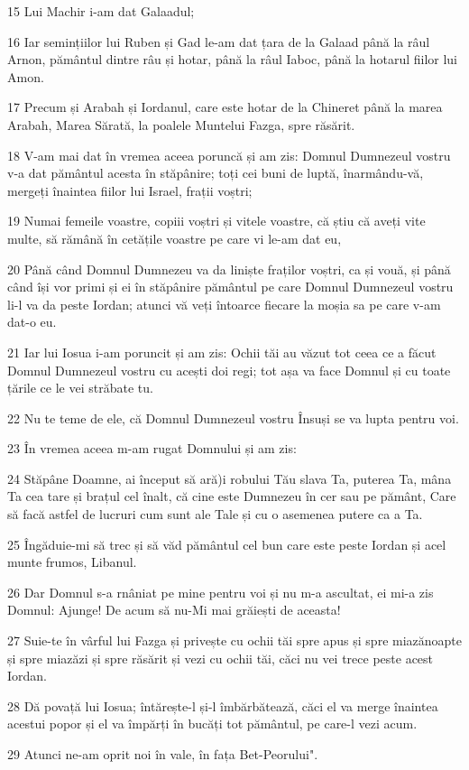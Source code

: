 \par 15 Lui Machir i-am dat Galaadul;
\par 16 Iar semințiilor lui Ruben și Gad le-am dat țara de la Galaad până la râul Arnon, pământul dintre râu și hotar, până la râul Iaboc, până la hotarul fiilor lui Amon.
\par 17 Precum și Arabah și Iordanul, care este hotar de la Chineret până la marea Arabah, Marea Sărată, la poalele Muntelui Fazga, spre răsărit.
\par 18 V-am mai dat în vremea aceea poruncă și am zis: Domnul Dumnezeul vostru v-a dat pământul acesta în stăpânire; toți cei buni de luptă, înarmându-vă, mergeți înaintea fiilor lui Israel, frații voștri;
\par 19 Numai femeile voastre, copiii voștri și vitele voastre, că știu că aveți vite multe, să rămână în cetățile voastre pe care vi le-am dat eu,
\par 20 Până când Domnul Dumnezeu va da liniște fraților voștri, ca și vouă, și până când își vor primi și ei în stăpânire pământul pe care Domnul Dumnezeul vostru li-l va da peste Iordan; atunci vă veți întoarce fiecare la moșia sa pe care v-am dat-o eu.
\par 21 Iar lui Iosua i-am poruncit și am zis: Ochii tăi au văzut tot ceea ce a făcut Domnul Dumnezeul vostru cu acești doi regi; tot așa va face Domnul și cu toate țările ce le vei străbate tu.
\par 22 Nu te teme de ele, că Domnul Dumnezeul vostru Însuși se va lupta pentru voi.
\par 23 În vremea aceea m-am rugat Domnului și am zis:
\par 24 Stăpâne Doamne, ai început să ară)i robului Tău slava Ta, puterea Ta, mâna Ta cea tare și brațul cel înalt, că cine este Dumnezeu în cer sau pe pământ, Care să facă astfel de lucruri cum sunt ale Tale și cu o asemenea putere ca a Ta.
\par 25 Îngăduie-mi să trec și să văd pământul cel bun care este peste Iordan și acel munte frumos, Libanul.
\par 26 Dar Domnul s-a rnâniat pe mine pentru voi și nu m-a ascultat, ei mi-a zis Domnul: Ajunge! De acum să nu-Mi mai grăiești de aceasta!
\par 27 Suie-te în vârful lui Fazga și privește cu ochii tăi spre apus și spre miazănoapte și spre miazăzi și spre răsărit și vezi cu ochii tăi, căci nu vei trece peste acest Iordan.
\par 28 Dă povață lui Iosua; întărește-l și-l îmbărbătează, căci el va merge înaintea acestui popor și el va împărți în bucăți tot pământul, pe care-l vezi acum.
\par 29 Atunci ne-am oprit noi în vale, în fața Bet-Peorului".

